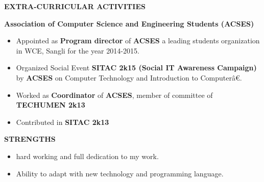 \documentclass{article}
\begin{document}
\vspace{1cm}

\begin{minipage}{\textwidth}
	
\begin{framed}
	\large{\textbf{EXTRA-CURRICULAR ACTIVITIES}}
\end{framed}

\textbf{\setlength{\parindent}{20pt}\indent Association of Computer Science and Engineering Students (ACSES)}
\begin{itemize}
	\itemsep1pt \parskip0pt 
	\setlength{\itemsep}{0.1cm}%
	\setlength{\parskip}{0.2cm}%
	\setlength{\parsep}{0.2cm}%
	\item Appointed as \textbf{Program director} of \textbf{ACSES} a leading students organization in WCE, Sangli for the year 2014-2015.
	\item Organized Social Event \textbf{SITAC 2k15 (Social IT Awareness Campaign)} by \textbf{ACSES} on Computer Technology and Introduction to Computerâ€.
	\item Worked as \textbf{Coordinator} of \textbf{ACSES}, member of committee of \textbf{TECHUMEN 2k13}
	\item Contributed in \textbf{SITAC 2k13}
	
\end{itemize}

\end{minipage}

\vspace{1cm}






\begin{minipage}{\textwidth}
	\begin{framed}
		\large{\textbf{STRENGTHS}}
	\end{framed}
	\begin{itemize}
		\item hard working and full dedication to my work.
		\item Ability to adapt with new technology and programming language.
	\end{itemize}		
\end{minipage}
\end{document}
